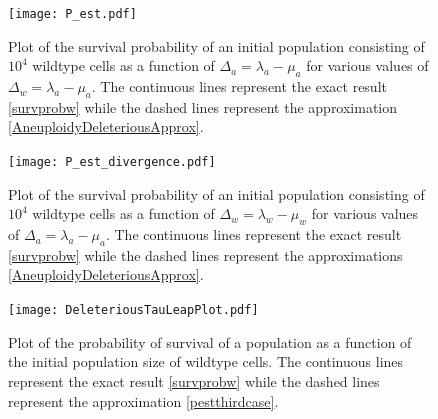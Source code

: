 \documentclass[11pt,a4paper]{article}
\begin{document}
\begin{figure}[!t]
 \vspace*{1\baselineskip}
\texttt{[image: P\_est.pdf]}
\caption{Plot of the survival probability of an initial population consisting of $10^{4}$ wildtype cells as a function of $\Delta_a=\lambda_a-\mu_a$ for various values of $\Delta_w=\lambda_a-\mu_a$. The continuous lines represent the exact result \eqref{survprobw} while the dashed lines represent the approximation \eqref{AneuploidyDeleteriousApprox}.}
\label{P_est}
\end{figure}
\begin{figure}[!t]
 \vspace*{1\baselineskip}
\texttt{[image: P\_est\_divergence.pdf]}
\caption{Plot of the survival probability of an initial population consisting of $10^{4}$ wildtype cells as a function of $\Delta_w=\lambda_w-\mu_w$ for various values of $\Delta_a=\lambda_a-\mu_a$. The continuous lines represent the exact result \eqref{survprobw} while the dashed lines represent the approximations \eqref{AneuploidyDeleteriousApprox}.}
\label{P_est}
\end{figure}
\begin{figure}[!t]
 \vspace*{1\baselineskip}
\texttt{[image: DeleteriousTauLeapPlot.pdf]}
\caption{Plot of the probability of survival of a population as a function of the initial population size of wildtype cells. The continuous lines represent the exact result \eqref{survprobw} while the dashed lines represent the approximation \eqref{pestthirdcase}.}
\label{DeleteriousPlot}
\end{figure}
\end{document}
